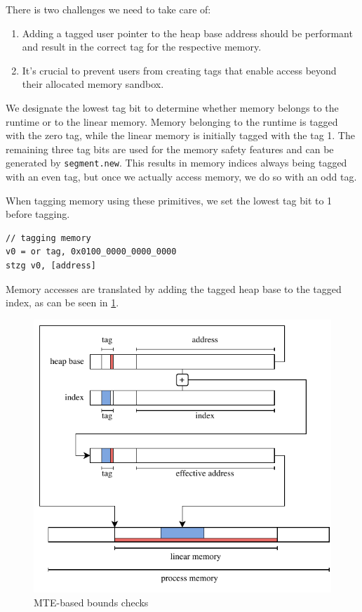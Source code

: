 There is two challenges we need to take care of:
\begin{enumerate}
    \item Adding a tagged user pointer to the heap base address should be performant and result in the correct tag for the respective memory.
    \item It's crucial to prevent users from creating tags that enable access beyond their allocated memory sandbox.
\end{enumerate}

We designate the lowest tag bit to determine whether memory belongs to the runtime or to the linear memory.
Memory belonging to the runtime is tagged with the zero tag, while the linear memory is initially tagged with the tag 1.
The remaining three tag bits are used for the memory safety features and can be generated by \texttt{segment.new}.
This results in memory indices always being tagged with an even tag, but once we actually access memory, we do so with an odd tag.

When tagging memory using these primitives, we set the lowest tag bit to 1 before tagging.

\begin{lstlisting}[frame=h,style=customc,
    label={lst:generated-code-tagging}]
// tagging memory
v0 = or tag, 0x0100_0000_0000_0000
stzg v0, [address]
\end{lstlisting}

Memory accesses are translated by adding the tagged heap base to the tagged index, as can be seen in \cref{fig:system-design-mem-safety-bounds}.

\begin{figure}[t]
    \centering
    \includegraphics[scale=0.75]{figures/build/bounds-mem-safety}
    \caption{MTE-based bounds checks}
    \label{fig:system-design-mem-safety-bounds}
\end{figure}

